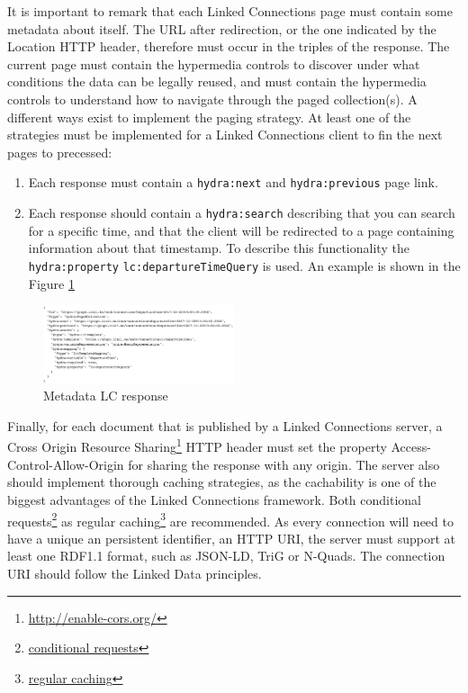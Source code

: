 \documentclass[sw]{iosart2x}
\begin{document}
It is important to remark that each Linked Connections page must contain some metadata about itself. The URL after redirection, or the one indicated by the Location HTTP header, therefore must occur in the triples of the response. The current page must contain the hypermedia controls to discover under what conditions the data can be legally reused, and must contain the hypermedia controls to understand how to navigate through the paged collection(s). A different ways exist to implement the paging strategy. At least one of the strategies must be implemented for a Linked Connections client to fin the next pages to precessed:
\begin{enumerate}
\item Each response must contain a \texttt{hydra:next} and \texttt{hydra:previous} page link.
\item Each response should contain a \texttt{hydra:search} describing that you can search for a specific time, and that the client will be redirected to a page containing information about that timestamp. To describe this functionality the \texttt{hydra:property} \texttt{lc:departureTimeQuery} is used. An example is shown in the Figure \ref{fig:metadata}
\end{enumerate}

\begin{figure}[t]
	\includegraphics[width=0.5\textwidth]{images/search.png}
	\caption{Metadata LC response}\label{fig:metadata}
\end{figure}

Finally, for each document that is published by a Linked Connections server, a Cross Origin Resource Sharing\footnote{\url{http://enable-cors.org/}} HTTP header must set the property Access-Control-Allow-Origin for sharing the response with any origin. The server also should implement thorough caching strategies, as the cachability is one of the biggest advantages of the Linked Connections framework. Both conditional requests\footnote{\url{conditional requests}} as regular caching\footnote{\url{regular caching}} are recommended. As every connection will need to have a unique an persistent identifier, an HTTP URI, the server must support at least one RDF1.1 format, such as JSON-LD\cite{world2014json}, TriG\cite{bizer2014rdf} or N-Quads\cite{cyganiak2008n}. The connection URI should follow the Linked Data principles\cite{bizer2009linked}.
\end{document}

